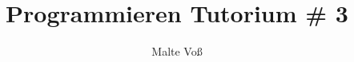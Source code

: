 \documentclass{sdqbeamer}
\title{Programmieren Tutorium \# 3}
\author{Malte Vo\ss}
\date{}        %
\begin{document}
\KITtitleframe


\end{document}
